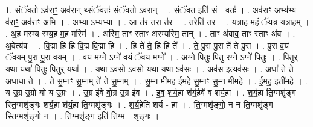 \documentclass[17pt]{extarticle}
\begin{document}
1. सं॒ॅवतो ऽव॑राꣳ॒॒ अव॑रान् थ्सं॒ॅवतः॑ सं॒ॅवतो ऽव॑रान् । . सं॒ॅवत॒ इति॑ सं - वतः॑ । . अव॑राꣳ अ॒भ्य॑भ्य व॑राꣳ॒॒ अव॑राꣳ अ॒भि । . अ॒भ्या ऽभ्य॑भ्या । . आ त॑र त॒रा त॑र । . त॒रेति॑ तर । . यत्रा॒ह म॒हं ॅयत्र॒ यत्रा॒हम् । . अ॒ह मस्म्य स्म्य॒ह म॒ह मस्मि॑ । . अस्मि॒ ताꣳ स्ताꣳ अस्म्यस्मि॒ तान् । . ताꣳ अ॑वाव॒ ताꣳ स्ताꣳ अ॑व । . अ॒वेत्य॑व । . वि॒द्मा हि हि वि॒द्म वि॒द्मा हि । . हि ते॑ ते॒ हि हि ते᳚ । . ते॒ पु॒रा पु॒रा ते॑ ते पु॒रा । . पु॒रा व॒यं ॅव॒यम् पु॒रा पु॒रा व॒यम् । . व॒य मग्ने ऽग्ने॑ व॒यं ॅव॒य मग्ने᳚ । . अग्ने॑ पि॒तुः पि॒तु रग्ने ऽग्ने॑ पि॒तुः । . पि॒तुर् यथा॒ यथा॑ पि॒तुः पि॒तुर् यथा᳚ । . यथा ऽव॒सो ऽव॑सो॒ यथा॒ यथा ऽव॑सः । . अव॑स॒ इत्यव॑सः । . अधा॑ ते॒ ते अधाधा॑ ते । . ते॒ सु॒म्नꣳ सु॒म्नम् ते॑ ते सु॒म्नम् । . सु॒म्न मी॑मह ईमहे सु॒म्नꣳ सु॒म्न मी॑महे । . ई॒म॒ह॒ इती॑महे । . य उ॒ग्र उ॒ग्रो यो य उ॒ग्रः । . उ॒ग्र इ॑वे वो॒ग्र उ॒ग्र इ॑व । . इ॒व॒ श॒र्य॒हा श॑र्य॒हेवे॑ व शर्य॒हा । . श॒र्य॒हा ति॒ग्मशृ॑ङ्ग स्ति॒ग्मशृ॑ङ्गः शर्य॒हा श॑र्य॒हा ति॒ग्मशृ॑ङ्गः । . श॒र्य॒हेति॑ शर्य - हा । . ति॒ग्मशृ॑ङ्गो॒ न न ति॒ग्मशृ॑ङ्ग स्ति॒ग्मशृ॑ङ्गो॒ न । . ति॒ग्मशृ॑ङ्ग॒ इति॑ ति॒ग्म - शृ॒ङ्गः॒ । \newline
\end{document}
